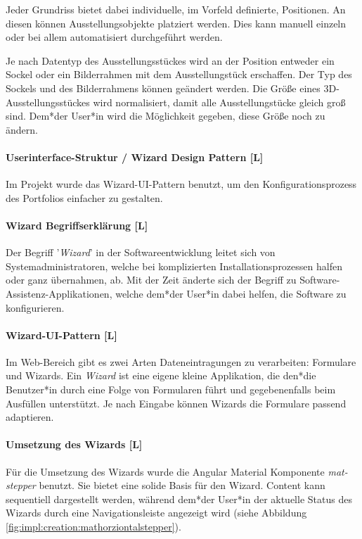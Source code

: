 Jeder Grundriss bietet dabei individuelle, im Vorfeld definierte, Positionen. An diesen können Ausstellungsobjekte
platziert werden. Dies kann manuell einzeln oder bei allem automatisiert durchgeführt werden.

Je nach Datentyp des Ausstellungsstückes wird an der Position entweder ein Sockel oder ein Bilderrahmen mit dem Ausstellungstück erschaffen. Der Typ des Sockels und des Bilderrahmens können geändert werden.
Die Größe eines 3D-Ausstellungsstückes wird normalisiert, damit alle Ausstellungstücke gleich groß sind. Dem*der User*in wird die Möglichkeit gegeben, diese Größe noch zu ändern.

\paragraph{Userinterface-Struktur / Wizard Design Pattern [L]}
\label{sec::contentcreation::wizard}
Im Projekt wurde das Wizard-UI-Pattern benutzt, um den Konfigurationsprozess des Portfolios einfacher zu gestalten.

\paragraph*{Wizard Begriffserklärung [L]}
Der Begriff '\emph{Wizard}' in der Softwareentwicklung leitet sich von Systemadministratoren, welche bei komplizierten Installationsprozessen halfen oder ganz übernahmen, ab. Mit der Zeit änderte sich der Begriff zu Software-Assistenz-Applikationen, welche dem*der User*in dabei helfen, die Software zu konfigurieren. \cite[Ursprung des Begriffs Wizard]{OrigionOfWizards}

\paragraph{Wizard-UI-Pattern [L]}
Im Web-Bereich gibt es zwei Arten Dateneintragungen zu verarbeiten: Formulare und Wizards. 
Ein \emph{Wizard} ist eine eigene kleine Applikation, die den*die Benutzer*in durch eine Folge von Formularen führt und gegebenenfalls beim Ausfüllen unterstützt. Je nach Eingabe können Wizards die Formulare passend adaptieren.\cite{WizradsDefinitionAndRecommandation}

\paragraph{Umsetzung des Wizards [L]}
Für die Umsetzung des Wizards wurde die Angular Material Komponente \emph{mat-stepper} benutzt. Sie bietet eine solide Basis für den Wizard. Content kann sequentiell dargestellt werden, während dem*der User*in der aktuelle Status des Wizards durch eine Navigationsleiste angezeigt wird (siehe Abbildung \ref{fig:impl:creation:mathorziontalstepper}). \cite{amStepper}

